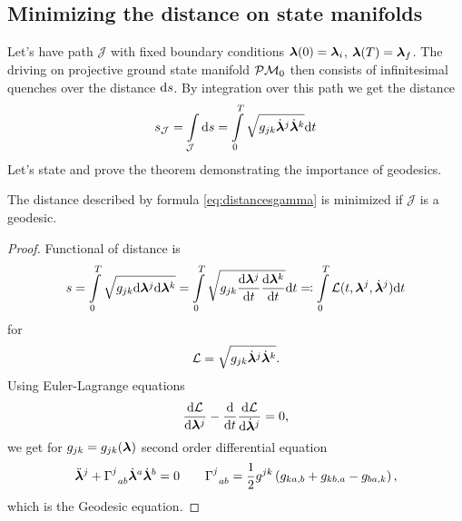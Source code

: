 \subsection{Minimizing the distance on state manifolds}
Let's have path $\mathcal J$ with fixed boundary conditions ${\bm\lambda}(0)={\bm\lambda}_i$, ${\bm\lambda}(T)={\bm\lambda}_f$.
The driving on projective ground state manifold $\mathcal{P}\mathcal{M}_0$ then consists of infinitesimal quenches over the distance $\mathrm{d} s$. By integration over this path we get the distance
\begin{equation}
    s_{\mathcal J}=\int\limits_{\mathcal J}\mathrm{d} s=\int\limits_{0}^{T}\sqrt{g_{jk}\dot{{\bm\lambda}}^j\dot{{\bm\lambda}}^k}\mathrm{d} t
    \label{eq:distancesgamma}
\end{equation}
Let's state and prove the theorem demonstrating the importance of geodesics.
\begin{thm}
    The distance described by formula \ref{eq:distancesgamma} is minimized if $\mathcal J$ is a geodesic.
\end{thm}

\begin{proof}
    Functional of distance is
    \begin{equation}
        s=\int\limits_0^{T} \sqrt{g_{jk}\mathrm{d}{\bm\lambda}^j\mathrm{d}{\bm\lambda}^k}=\int\limits_0^{T} \sqrt{g_{jk}\frac{\mathrm{d} {\bm\lambda}^j}{\mathrm{d} t}\frac{\mathrm{d} {\bm\lambda}^k}{\mathrm{d} t}}\mathrm{d} t \eqqcolon \int\limits_0^{T} \mathcal{L}(t,{\bm\lambda}^j,\dot{{\bm\lambda}}^j)\mathrm{d} t
    \end{equation}
    for 
    \begin{equation}
        \mathcal{L}=\sqrt{g_{jk}\dot{{\bm\lambda}}^j\dot{{\bm\lambda}}^k}.
    \end{equation}
    Using Euler-Lagrange equations 
    \begin{equation}
        \frac{\mathrm{d} \mathcal{L}}{\mathrm{d} {\bm\lambda}^j}-\frac{\mathrm{d} }{\mathrm{d} t}\frac{\mathrm{d} \mathcal{L}}{\mathrm{d} \dot{{\bm\lambda}}^j}=0,
    \end{equation}
    we get for $g_{jk}=g_{jk}({\bm\lambda})$ second order differential equation
    \begin{equation}
        \ddot{{\bm\lambda}}^j+\Gamma^j_{\;\;ab}\dot{{\bm\lambda}}^a\dot{{\bm\lambda}}^b=0\qquad \Gamma^j_{\;\;ab}=\frac{1}{2}g^{jk}\left(g_{ka,b}+g_{kb,a}-g_{ba,k}\right),
        \label{eq:geodesicEquaiton}
    \end{equation}
    which is the Geodesic equation.
\end{proof}











